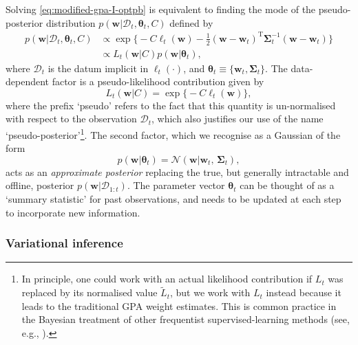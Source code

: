 Solving \eqref{eq:modified-gpa-I-optpb} is equivalent to finding the mode of the pseudo-posterior distribution $p(\mathbf{w}|\mathcal{D}_t, \boldsymbol{\theta}_t, C)$ defined by
\begin{equation}
\begin{split}
	p(\mathbf{w}|\mathcal{D}_t, \boldsymbol{\theta}_t, C) 
	&\propto \exp\Big\{-C\ell_{t}(\mathbf{w}) - \frac{1}{2}(\mathbf{w} - \mathbf{w}_t)^\text{T}\boldsymbol{\Sigma}_{t}^{-1}(\mathbf{w} - \mathbf{w}_t)\Big\}
	\\	
	&\propto L_t(\mathbf{w}|C)p(\mathbf{w}|\boldsymbol{\theta}_t),
\end{split}
\end{equation}
where $\mathcal{D}_t$ is the datum implicit in $\ell_t(\cdot)$, and $\boldsymbol{\theta}_t \equiv \{\mathbf{w}_t, \boldsymbol{\Sigma}_{t}\}$. The data-dependent factor is a pseudo-likelihood contribution given by
\begin{equation}
	L_t(\mathbf{w}|C) = \exp\Big\{-C\ell_{t}(\mathbf{w})\Big\},
\end{equation}
where the prefix `pseudo' refers to the fact that this quantity is un-normalised with respect to the observation $\mathcal{D}_t$, which also justifies our use of the name `pseudo-posterior'\footnote{In principle, one could work with an actual likelihood contribution if $L_t$ was replaced by its normalised value $\widetilde{L}_t$, but we work with $L_t$ instead because it leads to the traditional GPA weight estimates. This is common practice in the Bayesian treatment of other frequentist supervised-learning methods (see, e.g., \citep{polson&scott, deng16}).}.
The second factor, which we recognise as a Gaussian of the form
\begin{equation}
	p(\mathbf{w}|\boldsymbol{\theta}_t)
	= \mathcal{N}(\mathbf{w}|\mathbf{w}_t,\, \boldsymbol{\Sigma}_{t}),
\end{equation}
acts as an \emph{approximate posterior} replacing the true, but generally intractable and offline, posterior $p(\mathbf{w}|\mathcal{D}_{1:t})$. The parameter vector $\boldsymbol{\theta}_t$ can be thought of as a `summary statistic' for past observations, and needs to be updated at each step to incorporate new information.

\subsubsection{Variational inference}


